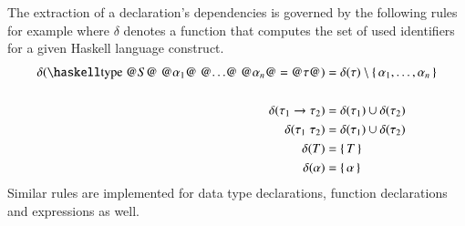 The extraction of a  declaration's dependencies is governed by the following rules for example where $\delta$ denotes a function that computes the set of used identifiers for a given Haskell language construct.
\begin{align*}
  \delta(\haskellM{type @$S$@ @$\alpha_1$@ @$\ldots$@ @$\alpha_n$@ = @$\tau$@})
    &= \delta(\tau)
      \setminus \{\, \alpha_1, \ldots, \alpha_n \,\}
  \\
  \\
  \delta(\tau_1 \rightarrow \tau_2) &= \delta(\tau_1) \cup \delta(\tau_2) \\
  \delta(\tau_1\;\tau_2)            &= \delta(\tau_1) \cup \delta(\tau_2) \\
  \delta(T)                         &= \{\, T \,\} \\
  \delta(\alpha)                    &= \{\, \alpha \,\}
\end{align*}
Similar rules are implemented for data type declarations, function declarations and expressions as well.
